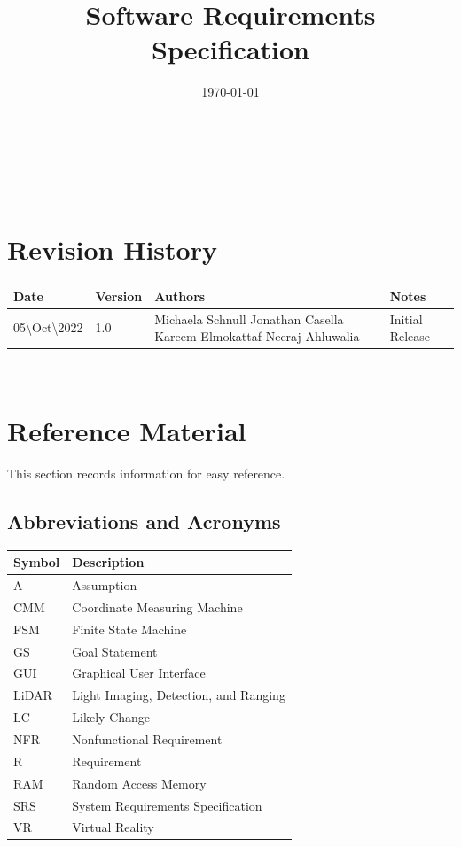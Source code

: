 \documentclass[12pt]{article}
\begin{document}
\title{Software Requirements Specification\\
\progname} 
\author{\authname}
\date{\today}
	
\maketitle

~\newpage


\tableofcontents

~\newpage

\section*{Revision History}

\begin{tabularx}{\textwidth}{p{3cm}p{2cm}p{4cm}X}
\toprule {\bf Date} & {\bf Version} & {\bf Authors} & {\bf Notes}\\
\midrule
05\textbackslash Oct\textbackslash 2022 & 1.0 & Michaela Schnull \newline Jonathan Casella \newline Kareem Elmokattaf \newline Neeraj Ahluwalia & Initial Release\\
\bottomrule
\end{tabularx}

~\newpage

\section{Reference Material}

This section records information for easy reference.

\subsection{Abbreviations and Acronyms}

\renewcommand{\arraystretch}{1.2}
\begin{tabular}{l l} 
  \toprule		
  \textbf{Symbol} & \textbf{Description}\\
  \midrule 
  A & Assumption\\
  CMM & Coordinate Measuring Machine\\
  FSM & Finite State Machine\\
  GS & Goal Statement\\
  GUI & Graphical User Interface\\
  LiDAR & Light Imaging, Detection, and Ranging\\
  LC & Likely Change\\
  NFR & Nonfunctional Requirement\\
  R & Requirement\\
  RAM & Random Access Memory\\
  SRS & System Requirements Specification\\
  VR & Virtual Reality\\
  \bottomrule
\end{tabular}\\
\end{document}
